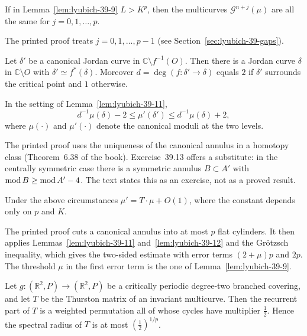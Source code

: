 \begin{lemma}
\label{lem:lyubich-39-10}
If in Lemma~\ref{lem:lyubich-39-9} $L>K^p$, then the multicurves $\mathcal G^{n+j}(\mu)$ are all the same for
$j=0,1,\dots,p$.
\end{lemma}

The printed proof treats $j=0,1,\dots,p-1$ (see Section~\ref{sec:lyubich-39-gaps}).

\begin{lemma}
\label{lem:lyubich-39-11}
Let $\delta'$ be a canonical Jordan curve in $\mathbb C\setminus f^{-1}(O)$.  Then there is a Jordan curve
$\delta$ in $\mathbb C\setminus O$ with $\delta'\simeq f^*(\delta)$.  Moreover $d=\deg(f\colon\delta'\to\delta)$
equals $2$ if $\delta'$ surrounds the critical point and $1$ otherwise.
\end{lemma}

\begin{lemma}
\label{lem:lyubich-39-12}
In the setting of Lemma~\ref{lem:lyubich-39-11},
\[
 d^{-1}\mu(\delta)-2\le\mu'(\delta')\le d^{-1}\mu(\delta)+2,
\]
where $\mu(\cdot)$ and $\mu'(\cdot)$ denote the canonical moduli at the two levels.
\end{lemma}

The printed proof uses the uniqueness of the canonical annulus in a homotopy class (Theorem~6.38 of the book).
Exercise~39.13 offers a substitute: in the centrally symmetric case there is a symmetric annulus $B\subset A'$
with $\operatorname{mod} B\ge\operatorname{mod} A'-4$.  The text states this as an exercise, not as a proved result.

\begin{lemma}
\label{lem:lyubich-39-15}
Under the above circumstances $\mu'=T\cdot\mu+O(1)$, where the constant depends only on $p$ and $K$.
\end{lemma}

The printed proof cuts a canonical annulus into at most $p$ flat cylinders.  It then applies
Lemmas~\ref{lem:lyubich-39-11} and~\ref{lem:lyubich-39-12} and the Gr\"otzsch inequality, which gives the two-sided
estimate with error terms $(2+\mu)p$ and $2p$.  The threshold $\mu$ in the first error term is the one of
Lemma~\ref{lem:lyubich-39-9}.

\begin{lemma}
\label{lem:lyubich-39-16}
Let $g\colon(\mathbb R^2,P)\to(\mathbb R^2,P)$ be a critically periodic degree-two branched covering, and let $T$
be the Thurston matrix of an invariant multicurve.  Then the recurrent part of $T$ is a weighted permutation
all of whose cycles have multiplier $\tfrac12$.  Hence the spectral radius of $T$ is at most $(\tfrac12)^{1/p}$.
\end{lemma}

